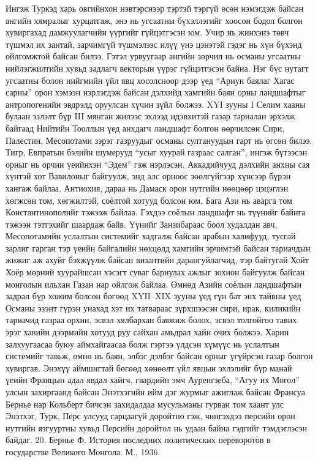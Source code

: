 Ингэж Туркэд харь овгийнхон нэвтэрснээр тэртэй тэргүй өсөн нэмэгдэж байсан ангийн хямралыг хурцатгаж, энэ нь угсаатны бүхэллэгийг хоосон бодол болгон хувиргахад дамжуулагчийн үүргийг гүйцэтгэсэн юм. Учир нь жинхэнэ төвч түшмэл их зантай, зарчимгүй түшмэлээс илүү үнэ цэнэтэй гэдэг нь хүн бүхэнд ойлгомжтой байсан билээ. Гэтэл урвуугаар ангийн зөрчил нь османы угсаатны нийлэгжилтийн хувьд задлагч векторын үүрэг гүйцэтгэсэн байна. Нэг бүс нутагт угсаатны болон нийгмийн үйл явц хосолсноор дээр үед “Ариун баялаг Хагас сарны” орон хэмээн нэрлэгдэж байсан дэлхийд хамгийн баян орны ландшафтыг антропогенийн эвдрэлд оруулсан хүчин зүйл болжээ. XYI зууны I Селим хааны булаан эзлэлт бүр III мянган жилээс эхлээд идэвхитэй газар тариалан эрхэлж байгаад Нийтийн Тооллын үед анхдагч ландшафт болгон өөрчилсөн Сири, Палестин, Месопотами зэрэг газруудыг османы султануудын гарт нь өгсөн билээ.
Тигр, Евпратын бэлийн шумерууд “усыг хуурай газраас салган”, ингэж бүтээсэн орныг нь орчин үеийнхэн “Эдем” гэж нэрлэсэн. Аккадийчууд дэлхийн анхны сая хүнтэй хот Вавилоныг байгуулж, энд алс орноос зөөлгүйгээр хүнсээр бүрэн хангаж байлаа. Антиохия, дараа нь Дамаск орон нутгийн нөөцөөр цэцэглэн хөгжсөн том, хөгжилтэй, соёлтой хотууд болсон юм. Бага Ази нь аварга том Константинополийг тэжээж байлаа.
Гэхдээ соёлын ландшафт нь түүнийг байнга тэжээн тэтгэхийг шаардаж байв. Үүнийг Занзибараас боол худалдан авч, Месопотамийн услалтын системийг хадгалж байсан арабын халифууд, тусгай зарлиг гарган тэр үеийн байгалийн нөхцөлд хамгийн эрчимтэй байсан тариачдын жижиг аж ахуйг бэхжүүлж байсан византийн дарангуйлагчид, тэр байтугай Хойт Хоёр мөрний хуурайшсан хэсэгт суваг бариулах ажлыг зохион байгуулж байсан монголын ильхан Газан нар ойлгож байлаа. Өмнөд Азийн соёлын ландшафтын задрал бүр хожим болсон бөгөөд XYII–XIX зууны үед гүн бат энх тайвны үед Османы эзэнт гүрэн унахад хэт их татвараас зүрхшээсэн сири, ирак, киликийн тариачид газраа орхин, эсвэл хялбархан баяжиж болох, эсвэл толгойгоо тавих эрэг хавийн дээрмийн хотууд руу сайхан амьдрал хайн очих болжээ. Харин залхуугаасаа буюу аймхайгаасаа болж гэртээ үлдсэн хүмүүс нь услалтын системийг тавьж, өмнө нь баян, элбэг дэлбэг байсан орныг үгүйрсэн газар болгон хувиргав.
Энэхүү аймшигтай бөгөөд хөнөөлт үйл явцын эхлэлийг бүр манай үеийн Францын адал явдал хайгч, гвардийн эмч Ауренгзеба, “Агуу их Могол” улсын захиргаанд байсан Энэтхэгийн ийм дэг журмыг ажиглаж байсан Франсуа Бернье нар Кольберт бичсэн захидалдаа мусульманы гурван том хаант улс Энэтхэг, Турк, Перс улсууд гарцаагүй доройтно гэж, чингэхдээ персийн орон нутгийн язгууртны хувьд Персийн доройтол нь удаан байна гэдгийг тэмдэглэсэн байдаг. 20. Бернье Ф. История последних политических переворотов в государстве Великого Монгола. М., 1936.
